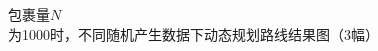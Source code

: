 \documentclass[10.5pt,twocolumn]{jbuaa}
\begin{document}
\begin{figure}[!h]
{\begin{minipage}{5cm}
		\end{minipage}}
		\caption{包裹量$N$为1000时，不同随机产生数据下动态规划路线结果图（3幅）} 
		\label{fig:3}                                          %

	\end{figure}
\end{document}
